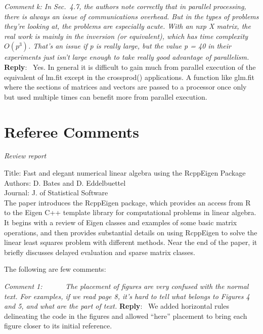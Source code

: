 \documentclass[10pt]{article}
\newcommand{\pointRaised}[2]{\smallskip %
  \textsl{{\fontseries{b}\selectfont #1}: #2}\newline}
\newcommand{\reply}[1]{\textbf{Reply}:\ #1 \smallskip } %
\begin{document}
\pointRaised{Comment k}{
  In Sec.~4.7, the authors note correctly that in parallel processing,
  there is always an issue of communications overhead. But in the types
  of problems they're looking at, the problems are especially acute. With
  an nxp X matrix, the real work is mainly in the inversion (or
  equivalent), which has time complexity $O(p^3)$. That's an issue if p is
  really large, but the value p = 40 in their experiments just isn't large
  enough to take really good advantage of parallelism.
}
\reply{
  Yes.  In general it is difficult to gain much from parallel
  execution of the equivalent of lm.fit except in the crossprod()
  applications.  A function like glm.fit where the sections of
  matrices and vectors are passed to a processor once only but used
  multiple times can benefit more from parallel execution.
}


\section*{Referee Comments}

{ \sl
  Review report

  Title: Fast and elegant numerical linear algebra using the RcppEigen Package \\
  Authors: D. Bates and D. Eddelbuettel \\
  Journal: J. of Statistical Software \\

  The paper introduces the RcppEigen package, which provides an
  access from R to the Eigen C++ template library for computational
  problems in linear algebra. It begins with a review of Eigen
  classes and examples of some basic matrix operations, and then
  provides substantial details on using RcppEigen to solve the
  linear least squares problem with different methods. Near the end
  of the paper, it briefly discusses delayed evaluation and sparse
  matrix classes. 

  The following are few comments: 
}


\pointRaised{Comment 1}{     
  The placement of figures are very confused with the normal text. 
  For examples, if we read page 8, it's hard to tell what belongs to 
  Figures 4 and 5, and what are the part of text. 
}
\reply{
  We added horizontal rules delineating the code in the figures and
  allowed ``here'' placement to bring each figure closer to its
  initial reference.
}
\end{document}
